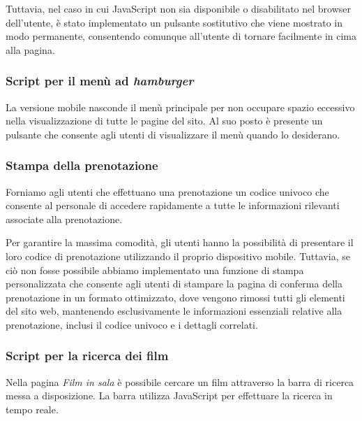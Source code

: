 Tuttavia, nel caso in cui JavaScript non sia disponibile o disabilitato nel browser\\ dell'utente, è stato implementato un pulsante sostitutivo che viene mostrato in modo permanente, consentendo comunque all'utente di tornare facilmente in cima alla pagina.

\subsubsection{Script per il menù ad \textit{hamburger}}
La versione mobile nasconde il menù principale per non occupare spazio eccessivo nella visualizzazione di tutte le pagine del sito. Al suo posto è presente un pulsante che consente agli utenti di visualizzare il menù quando lo desiderano.

\subsubsection{Stampa della prenotazione}
Forniamo agli utenti che effettuano una prenotazione un codice univoco che consente al personale di accedere rapidamente a tutte le informazioni rilevanti associate alla prenotazione.

Per garantire la massima comodità, gli utenti hanno la possibilità di presentare il loro codice di prenotazione utilizzando il proprio dispositivo mobile. Tuttavia, se ciò non fosse possibile abbiamo implementato una funzione di stampa personalizzata che consente agli utenti di stampare la pagina di conferma della prenotazione in un formato ottimizzato, dove vengono rimossi tutti gli elementi del sito web, mantenendo esclusivamente le informazioni essenziali relative alla prenotazione, inclusi il codice univoco e i dettagli correlati.

\subsubsection{Script per la ricerca dei film}
Nella pagina \textit{Film in sala} è possibile cercare un film attraverso la barra di ricerca messa a disposizione. La barra utilizza JavaScript per effettuare la ricerca in tempo reale.
